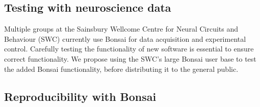 \subsection{Testing with neuroscience data}
\label{sec:testingWithNeuroscienceData}

Multiple groups at the Sainsbury Wellcome Centre for Neural Circuits and Behaviour (SWC) currently use Bonsai for data acquisition and
experimental control. Carefully testing the functionality of new software is
essential to ensure correct functionality. We propose using the SWC's large Bonsai user base to test the added Bonsai functionality,
before distributing it to the general public.

\subsection{Reproducibility with Bonsai}
\label{sec:reproducibility}

